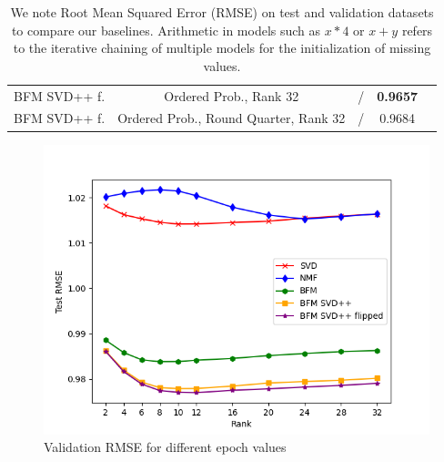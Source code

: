 \documentclass[10pt,conference,compsocconf]{IEEEtran}
\begin{document}
\begin{table}
{\begin{tabular}{|| c | c | c | c | c ||}
                BFM SVD++ f.         & Ordered Prob., Rank 32                & /                       & \textbf{ 0.9657 }      &                         \\
                BFM SVD++ f.         & Ordered Prob., Round Quarter, Rank 32 & /                       & 0.9684                 &                         \\
                \hline
            \end{tabular}
        }
        \caption{We note Root Mean Squared Error (RMSE) on test and validation datasets to compare our baselines.
        Arithmetic in models such as $x * 4$ or $x + y$ refers to the iterative chaining of multiple models for the initialization of missing values.
        }
        \label{tab:ablation}
    \end{table}

    \begin{figure}
        \includegraphics[width=\columnwidth]{figures/rank.png}
        \caption{Validation RMSE for different epoch values}
        \label{fig:rank}
    \end{figure}
\end{document}
